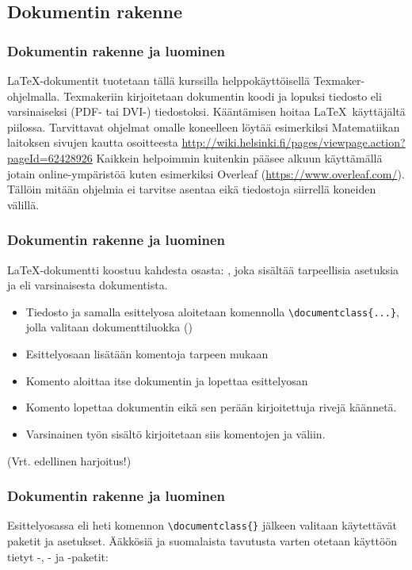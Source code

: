\subsection{Dokumentin rakenne}
\begin{frame}[fragile]
    \frametitle{Dokumentin rakenne ja luominen}
    \LaTeX-dokumentit tuotetaan tällä kurssilla helppokäyttöisellä Texmaker-ohjelmalla.
    \pause
    \vaihto
    Texmakeriin kirjoitetaan dokumentin koodi ja lopuksi tiedosto  eli  varsinaiseksi (PDF- tai DVI-) tiedostoksi. Kääntämisen hoitaa \LaTeX\ käyttäjältä piilossa.
    \pause
    \vaihto
    Tarvittavat ohjelmat omalle koneelleen löytää esimerkiksi Matematiikan laitoksen sivujen kautta osoitteesta
    \url{http://wiki.helsinki.fi/pages/viewpage.action?pageId=62428926}
    \pause
    \vaihto
    Kaikkein helpoimmin kuitenkin pääsee alkuun käyttämällä jotain online-ympäristöä kuten esimerkiksi Overleaf (\url{https://www.overleaf.com/}). Tällöin mitään ohjelmia ei tarvitse asentaa eikä tiedostoja siirrellä koneiden välillä.
\end{frame}

\begin{frame}[fragile]
    
\end{frame}

\begin{frame}[fragile]
    \frametitle{Dokumentin rakenne ja luominen}
    \LaTeX-dokumentti koostuu kahdesta osasta: , joka sisältää tarpeellisia asetuksia ja  eli varsinaisesta dokumentista.
    \pause
    \begin{itemize}[<+->]
        \item Tiedosto ja samalla esittelyosa aloitetaan komennolla \lstinline+\documentclass{...}+, jolla valitaan dokumenttiluokka ()
        \item Esittelyosaan lisätään komentoja tarpeen mukaan
        \item Komento \lstinline++ aloittaa itse dokumentin ja lopettaa esittelyosan
        \item Komento \lstinline++  lopettaa dokumentin eikä sen perään kirjoitettuja rivejä käännetä.
        \item Varsinainen työn sisältö kirjoitetaan siis komentojen \lstinline++  ja  \lstinline++  väliin.
    \end{itemize}
    (Vrt. edellinen harjoitus!)
\end{frame}

\begin{frame}[fragile]
    \frametitle{Dokumentin rakenne ja luominen}
    Esittelyosassa eli heti komennon \lstinline+\documentclass{}+  jälkeen valitaan käytettävät paketit ja asetukset. \pause Ääkkösiä ja suomalaista tavutusta varten otetaan käyttöön tietyt -, - ja -paketit:\pause
    
\end{frame}

